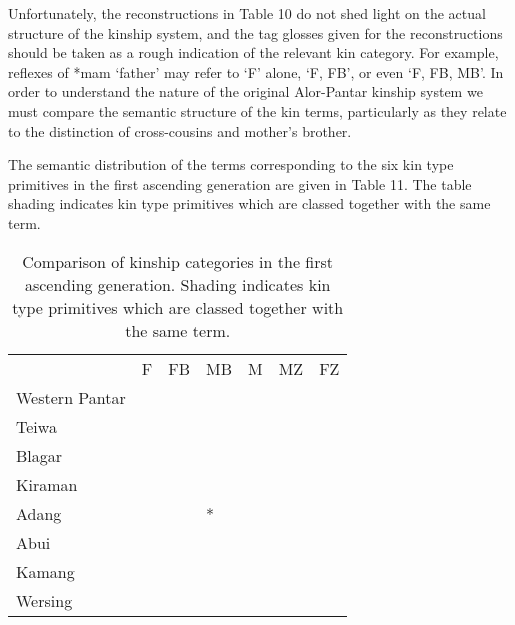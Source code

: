 Unfortunately, the reconstructions in Table 10 do not shed light on the actual structure of the kinship system, and the tag glosses given for the reconstructions should be taken as a rough indication of the relevant kin category. For example, reflexes of *mam `father' may refer to `F' alone, `F, FB', or even `F, FB, MB'. In order to understand the nature of the original Alor-Pantar kinship system we must compare the semantic structure of the kin terms, particularly as they relate to the distinction of cross-cousins and mother's brother.

The semantic distribution of the terms corresponding to the six kin type primitives in the first ascending generation are given in Table 11. The table shading indicates kin type primitives which are classed together with the same term.



\begin{table}\centering
\begin{tabular}{lllllll} & F\par & FB\par & MB\par & M\par & MZ\par & FZ\par\\
Western Pantar &  &  &  &  &  & \\
Teiwa &  &  &  &  &  & \\
Blagar &  &  &  &  &  & \\
Kiraman &  &  &  &  &  & \\
Adang &  &  & *\par &  &  & \\
Abui &  &  &  &  &  & \\
Kamang &  &  &  &  &  & \\
Wersing &  &  &  &  &  & \\
\end{tabular}

\caption{Comparison of kinship categories in the first ascending generation. Shading indicates kin type primitives which are classed together with the same term.}
\end{table}

